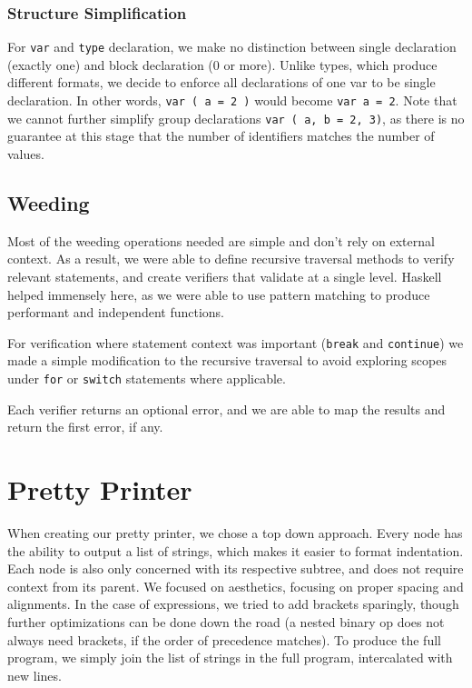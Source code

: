 \documentclass[11pt]{article}
\begin{document}
\subsubsection{Structure Simplification}
\label{sec:orgb239424}
For \texttt{var} and \texttt{type} declaration, we make no distinction between
single declaration (exactly one) and block declaration (0 or
more). Unlike types, which produce different formats, we decide to
enforce all declarations of one var to be single declaration. In
other words, \texttt{var ( a = 2 )} would become \texttt{var a = 2}. Note that
we cannot further simplify group declarations \texttt{var ( a, b = 2,
    3)}, as there is no guarantee at this stage that the number of
identifiers matches the number of values.
\subsection{Weeding}
\label{sec:org7efb4b0}
Most of the weeding operations needed are simple and don't rely
on external context. As a result, we were able to define recursive
traversal methods to verify relevant statements, and create verifiers
that validate at a single level. Haskell helped immensely here, as
we were able to use pattern matching to produce performant and
independent functions.

For verification where statement context was important (\texttt{break} and
\texttt{continue}) we made a simple modification to the recursive traversal
to avoid exploring scopes under \texttt{for} or \texttt{switch} statements
where applicable.

Each verifier returns an optional error, and we are able to map the
results and return the first error, if any.
\section{Pretty Printer}
\label{sec:org9b0b4e9}
When creating our pretty printer, we chose a top down approach.
Every node has the ability to output a list of strings, which makes
it easier to format indentation. Each node is also only concerned
with its respective subtree, and does not require context from its
parent. We focused on aesthetics, focusing on proper spacing and
alignments. In the case of expressions, we tried to add brackets
sparingly, though further optimizations can be done down the road
(a nested binary op does not always need brackets, if the order of
precedence matches). To produce the full program, we simply join
the list of strings in the full program, intercalated with new lines.
\end{document}
